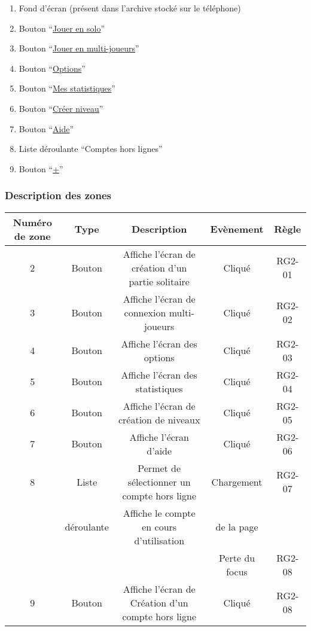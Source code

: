 \documentclass{report}
\begin{document}
		\begin{enumerate}
		  \item Fond d'écran (présent dans l'archive stocké sur le téléphone)
		  \item Bouton ``\hyperlink{Creer partie solo}{Jouer en solo}''
		  \item Bouton ``\hyperlink{Connexion multi-joueurs}{Jouer en multi-joueurs}''
		  \item Bouton ``\hyperlink{Options}{Options}''
		  \item Bouton ``\hyperlink{Statistiques}{Mes statistiques}''
		  \item Bouton ``\hyperlink{Creer niveau}{Créer niveau}''
		  \item Bouton ``\hyperlink{Aide}{Aide}''
		  \item Liste déroulante ``Comptes hors lignes''
		  \item Bouton ``\hyperlink{profil}{+}''
		\end{enumerate}

		\subsubsection{Description des zones}
		
		\begin{tabular}{|c|c|c|c|c|} \hline
			Numéro de zone & Type  & Description & Evènement &	Règle \\\hline 
			2 & Bouton & Affiche l'écran de création d'un partie solitaire & Cliqué & RG2-01 \\\hline
			3 & Bouton & Affiche l'écran de connexion multi-joueurs & Cliqué & RG2-02 \\\hline
			4 & Bouton & Affiche l'écran des options & Cliqué & RG2-03 \\\hline
			5 & Bouton & Affiche l'écran des statistiques & Cliqué & RG2-04 \\\hline
			6 & Bouton & Affiche l'écran de création de niveaux & Cliqué & RG2-05 \\\hline
			7 & Bouton & Affiche l'écran d'aide & Cliqué & RG2-06 \\\hline
			8 & Liste & Permet de sélectionner un compte hors ligne & Chargement  & RG2-07 \\ 
			  & déroulante & Affiche le compte en cours d'utilisation & de la page & \\
			  &            &                                          & Perte du focus & RG2-08\\\hline
			9 & Bouton & Affiche l'écran de Création d'un compte hors ligne & Cliqué & RG2-08 \\\hline
			
		\end{tabular}
		
\end{document}
